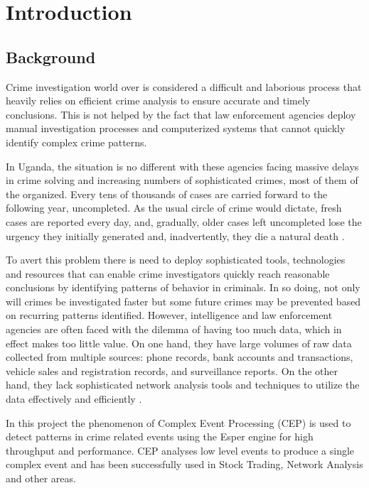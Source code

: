 \section{Introduction}
\subsection{Background}

\noindent Crime investigation world over is considered a difficult and laborious process that heavily relies on efficient crime analysis to ensure accurate and timely conclusions. This is not helped by the fact that law enforcement agencies deploy manual investigation processes and computerized systems that cannot quickly identify complex crime patterns.

\noindent In Uganda, the situation is no different with these agencies facing massive delays in crime solving and increasing numbers of sophisticated crimes, most of them of the organized. Every tens of thousands of cases are carried forward to the following year, uncompleted. As the usual circle of crime would dictate, fresh cases are reported every day, and, gradually, older cases left uncompleted lose the urgency they initially generated and, inadvertently, they die a natural death \cite{eleven}.

\noindent To avert this problem there is need to deploy sophisticated tools, technologies and resources that can enable crime investigators quickly reach reasonable conclusions by identifying patterns of behavior in criminals. In so doing, not only will crimes be investigated faster but some future crimes may be prevented based on recurring patterns identified. However, intelligence and law enforcement agencies are often faced with the dilemma of having too much data, which in effect makes too little value. On one hand, they have large volumes of raw data collected from multiple sources: phone records, bank accounts and transactions, vehicle sales and registration records, and surveillance reports. On the other hand, they lack sophisticated network analysis tools and techniques to utilize the data effectively and efficiently \cite{fifteen}.

\noindent In this project the phenomenon of Complex Event Processing (CEP) is used to detect patterns in crime related events using the Esper engine for high throughput and performance. CEP analyses low level events to produce a single complex event and has been successfully used in Stock Trading, Network Analysis and other areas.

